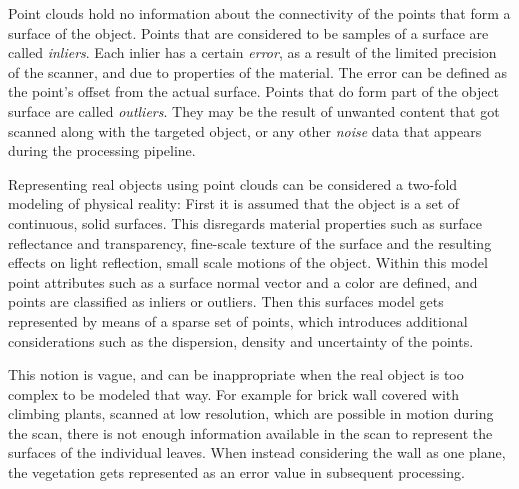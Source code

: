 Point clouds hold no information about the connectivity of the points that form a surface of the object. Points that are considered to be samples of a surface are called \emph{inliers}. Each inlier has a certain \emph{error}, as a result of the limited precision of the scanner, and due to properties of the material. The error can be defined as the point's offset from the actual surface. Points that do form part of the object surface are called \emph{outliers}. They may be the result of unwanted content that got scanned along with the targeted object, or any other \emph{noise} data that appears during the processing pipeline.

Representing real objects using point clouds can be considered a two-fold modeling of physical reality: First it is assumed that the object is a set of continuous, solid surfaces. This disregards material properties such as surface reflectance and transparency, fine-scale texture of the surface and the resulting effects on light reflection, small scale motions of the object. Within this model point attributes such as a surface normal vector and a color are defined, and points are classified as inliers or outliers. Then this surfaces model gets represented by means of a sparse set of points, which introduces additional considerations such as the dispersion, density and uncertainty of the points.

This notion is vague, and can be inappropriate when the real object is too complex to be modeled that way. For example for brick wall covered with climbing plants, scanned at low resolution, which are possible in motion during the scan, there is not enough information available in the scan to represent the surfaces of the individual leaves. When instead considering the wall as one plane, the vegetation gets represented as an error value in subsequent processing.


